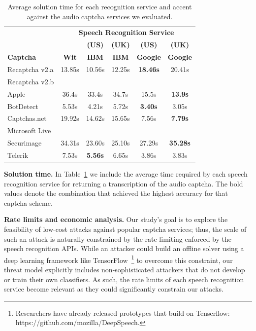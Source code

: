 \begin{table}[t]
\centering
\caption{Average solution time for each recognition service and accent against the audio captcha services we evaluated.}
\begin{tabular}{lccccc}
\toprule
&\multicolumn{5}{c}{\textbf{Speech Recognition Service}}\\
\cmidrule{2-6}
& & \textbf{(US)} & \textbf{(UK)} & \textbf{(US)} & \textbf{(UK)} \\
\textbf{Captcha}&  \textbf{Wit} & \textbf{IBM} & \textbf{IBM} & \textbf{Google} & \textbf{Google} \\
\hline
Recaptcha v2.a & 13.85s & 10.56s  & 12.25s & \textbf{18.46s} & 20.41s \\
\rowcolor{Gray}
Recaptcha v2.b &  &  &  & & \\
Apple  & 36.4s & 33.4s  & 34.7s & 15.5s & \textbf{13.9s} \\
\rowcolor{Gray}
BotDetect  & 5.53s  & 4.21s & 5.72s & \textbf{3.40s} & 3.05s \\
Captchas.net  & 19.92s  & 14.62s  & 15.65s  & 7.56s & \textbf{7.79s} \\
\rowcolor{Gray}
Microsoft Live & &  &  & & \\
Securimage  & 34.31s & 23.60s & 25.10s  & 27.29s & \textbf{35.28s} \\
\rowcolor{Gray}
Telerik  & 7.53s & \textbf{5.56s} & 6.65s & 3.86s & 3.83s \\
\bottomrule
\end{tabular}
\label{tab:solution_time}
\end{table}

\textbf{Solution time.} In Table~\ref{tab:solution_time} we include the average time required by each speech recognition 
service for returning a transcription of the audio captcha. The bold values denote the combination that achieved the highest 
accuracy for that captcha scheme.


\textbf{Rate limits and economic analysis.} Our study's goal is to explore the feasibility of low-cost attacks 
against popular captcha services; thus, the scale of such an attack is naturally constrained by the rate
limiting enforced by the speech recognition APIs. While an attacker could build an offline solver
using a deep learning framework like TensorFlow~\cite{abadi2016tensorflow}\footnote{Researchers have already
released prototypes that build on Tenserflow: {https://github.com/mozilla/DeepSpeech}.} to overcome this constraint,
our threat model explicitly includes non-sophisticated attackers that do not develop or train their own 
classifiers. As such, the rate limits of each speech recognition service become relevant as they could significantly 
constrain our attacks. 

